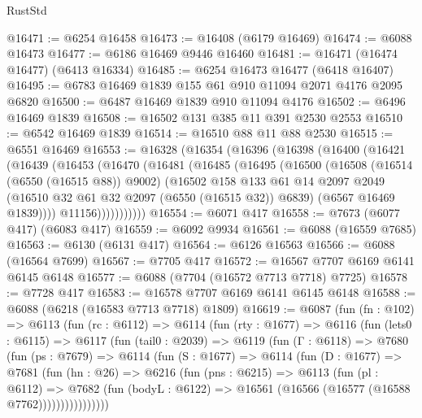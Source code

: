 \begin{lexlean}{RustStd}
\begin{coremodule}
@16471 := @6254 @16458
@16473 := @16408 (@6179 @16469)
@16474 := @6088 @16473
@16477 := @6186 @16469 @9446 @16460
@16481 := @16471 (@16474 @16477) (@6413 @16334)
@16485 := @6254 @16473 @16477 (@6418 @16407)
@16495 := @6783 @16469 @1839 @155 @61 @910 @11094 @2071 @4176 @2095 @6820
@16500 := @6487 @16469 @1839 @910 @11094 @4176
@16502 := @6496 @16469 @1839
@16508 := @16502 @131 @385 @11 @391 @2530 @2553
@16510 := @6542 @16469 @1839
@16514 := @16510 @88 @11 @88 @2530
@16515 := @6551 @16469
@16553 := @16328
    (@16354
      (@16396
        (@16398
          (@16400
            (@16421
              (@16439
                (@16453
                  (@16470
                    (@16481
                      (@16485
                        (@16495
                          (@16500
                            (@16508
                              (@16514 (@6550 (@16515 @88)) @9002)
                              (@16502
                                @158
                                @133
                                @61
                                @14
                                @2097
                                @2049
                                (@16510 @32 @61 @32 @2097 (@6550 (@16515 @32)) @6839)
                                (@6567 @16469 @1839))))
                          @11156)))))))))))
@16554 := @6071 @417
@16558 := @7673 (@6077 @417) (@6083 @417)
@16559 := @6092 @9934
@16561 := @6088 (@16559 @7685)
@16563 := @6130 (@6131 @417)
@16564 := @6126 @16563
@16566 := @6088 (@16564 @7699)
@16567 := @7705 @417
@16572 := @16567 @7707 @6169 @6141 @6145 @6148
@16577 := @6088 (@7704 (@16572 @7713 @7718) @7725)
@16578 := @7728 @417
@16583 := @16578 @7707 @6169 @6141 @6145 @6148
@16588 := @6088 (@6218 (@16583 @7713 @7718) @1809)
@16619 := @6087
    (fun (fn : @102) =>
    @6113
      (fun (rc : @6112) =>
      @6114
        (fun (rty : @1677) =>
        @6116
          (fun (lets0 : @6115) =>
          @6117
            (fun (tail0 : @2039) =>
            @6119
              (fun (Γ : @6118) =>
              @7680
                (fun (ps : @7679) =>
                @6114
                  (fun (S : @1677) =>
                  @6114
                    (fun (D : @1677) =>
                    @7681
                      (fun (hn : @26) =>
                      @6216
                        (fun (pns : @6215) =>
                        @6113
                          (fun (pl : @6112) =>
                          @7682
                            (fun (bodyL : @6122) =>
                            @16561 (@16566 (@16577 (@16588 @7762))))))))))))))))

\end{coremodule}
\end{lexlean}
